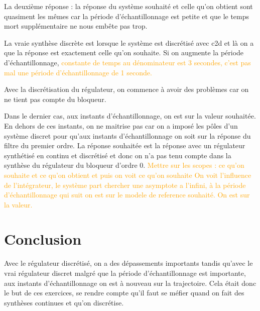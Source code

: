 La deuxième réponse : la réponse du système souhaité et celle qu'on obtient sont quasiment les mêmes car la période d'échantillonnage est petite et que le temps mort supplémentaire ne nous embête pas trop.

La vraie synthèse discrète est lorsque le système est discrétisé avec c2d et là on a que la réponse est exactement celle qu'on souhaite.
Si on augmente la période d'échantillonnage, \textcolor{orange}{constante de temps au dénominateur est 3 secondes, c'est pas mal une période d'échantillonnage de 1 seconde.}

Avec la discrétisation du régulateur, on commence à avoir des problèmes car on ne tient pas compte du bloqueur.

Dans le dernier cas, aux instants d'échantillonnage, on est sur la valeur souhaitée. En dehors de ces instants, on ne maitrise pas car on a imposé les pôles d'un système discret pour qu'aux instants d'échantillonnage on soit sur la réponse du filtre du premier ordre.
La réponse souhaitée est la réponse avec un régulateur synthétisé en continu et discrétisé et donc on n'a pas tenu compte dans la synthèse du régulateur du bloqueur d'ordre 0.
\textcolor{orange}{Mettre sur les scopes : ce qu'on souhaite et ce qu'on obtient et puis on voit ce qu'on souhaite
On voit l'influence de l'intégrateur, le système part chercher une asymptote a l'infini, à la période d'échantillonnage qui suit on est sur le modele de reference souhaité. On est sur la valeur.}


\section{Conclusion}

Avec le régulateur discrétisé, on a des dépassements importants tandis qu'avec le vrai régulateur discret malgré que la période d'échantillonnage est importante, aux instants d'échantillonnage on est à nouveau sur la trajectoire.
Cela était donc le but de ces exercices, se rendre compte qu'il faut se méfier quand on fait des synthèses continues et qu'on discrétise.